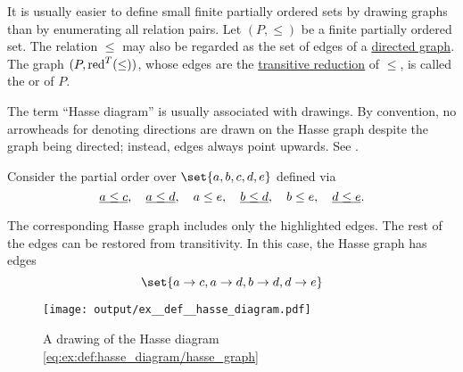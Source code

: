 \begin{definition}\label{def:hasse_diagram}
  It is usually easier to define small finite partially ordered sets by drawing graphs than by enumerating all relation pairs. Let \( (P, \leq) \) be a finite partially ordered set. The relation \( \leq \) may also be regarded as the set of edges of a \hyperref[def:quiver/simple]{directed graph}. The graph \( (P, \operatorname{red}^T(\leq)) \), whose edges are the \hyperref[def:relation_closures/transitive]{transitive reduction} of \( \leq \), is called the  or  of \( P \).
\end{definition}
\begin{comments}
  \item The term \enquote{Hasse diagram} is usually associated with drawings. By convention, no arrowheads for denoting directions are drawn on the Hasse graph despite the graph being directed; instead, edges always point upwards. See .
\end{comments}

\begin{example}\label{ex:def:hasse_diagram}
  Consider the partial order over \( \set{ a, b, c, d, e } \) defined via
  \begin{equation}\label{eq:ex:def:hasse_diagram/partially ordered set}
    \underline{\smash{a \leq c}},\quad \underline{\smash{a \leq d}},\quad a \leq e,\quad \underline{\smash{b \leq d}},\quad b \leq e,\quad \underline{\smash{d \leq e}}.
  \end{equation}

  The corresponding Hasse graph includes only the highlighted edges. The rest of the edges can be restored from transitivity. In this case, the Hasse graph has edges
  \begin{equation}\label{eq:ex:def:hasse_diagram/hasse_graph}
    \set{ a \to c, a \to d, b \to d, d \to e }
  \end{equation}

  \begin{figure}[!ht]
    \centering
    \texttt{[image: output/ex\_\_def\_\_hasse\_diagram.pdf]}
    \caption{A drawing of the Hasse diagram \eqref{eq:ex:def:hasse_diagram/hasse_graph}}
    \label{fig:ex:def:hasse_diagram}
  \end{figure}
\end{example}

